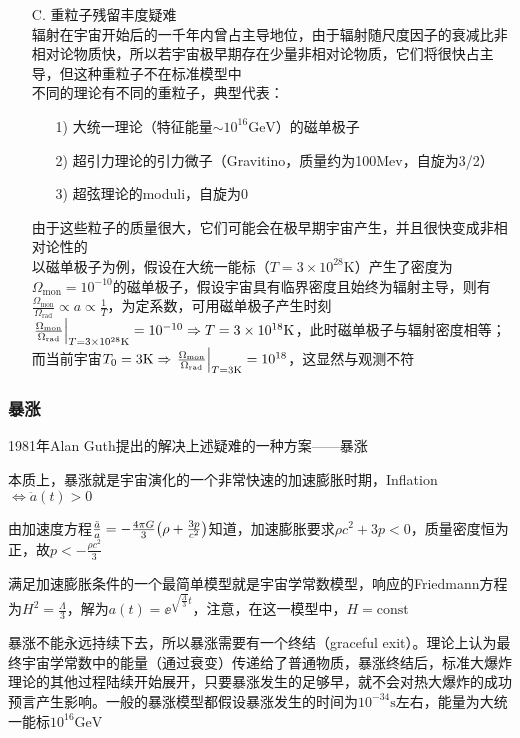 \begin{itemize}
	\item[C. ] 重粒子残留丰度疑难 \\
	辐射在宇宙开始后的一千年内曾占主导地位，由于辐射随尺度因子的衰减比非相对论物质快，所以若宇宙极早期存在少量非相对论物质，它们将很快占主导，但这种重粒子不在标准模型中 \\
	不同的理论有不同的重粒子，典型代表：
	\begin{itemize}
		\item[1)] 大统一理论（特征能量$\sim 10^{16} \mathrm{GeV}$）的磁单极子
		\item[2)] 超引力理论的引力微子（Gravitino，质量约为100Mev，自旋为3/2）
		\item[3)] 超弦理论的moduli，自旋为0
	\end{itemize}
	由于这些粒子的质量很大，它们可能会在极早期宇宙产生，并且很快变成非相对论性的 \\
	以磁单极子为例，假设在大统一能标（$T = 3 \times 10^{28} \mathrm{K}$）产生了密度为$\Omega_{\text{mon}} = 10^{-10}$的磁单极子，假设宇宙具有临界密度且始终为辐射主导，则有$\frac{\Omega_{\text{mon}}}{\Omega_{\text{rad}}} \propto a \propto \frac{1}{T}$，为定系数，可用磁单极子产生时刻$\eval{\frac{\Omega_{\text{mon}}}{\Omega_{\text{rad}}}}_{T = 3 \times 10^{28} \mathrm{K}} = 10^{-10} \Rightarrow T = 3 \times 10^{18} \mathrm{K}$，此时磁单极子与辐射密度相等；而当前宇宙$T_0 = 3 \mathrm{K} \Rightarrow \eval{\frac{\Omega_{\text{mon}}}{\Omega_{\text{rad}}}}_{T = 3  \mathrm{K}} = 10^{18}$，这显然与观测不符
\end{itemize}

\subsubsection{暴涨}
\par 
1981年Alan Guth提出的解决上述疑难的一种方案——暴涨
\par 
本质上，暴涨就是宇宙演化的一个非常快速的加速膨胀时期，Inflation$\Leftrightarrow \ddot{a}(t) > 0$
\par 
由加速度方程$\frac{\ddot{a}}{a} = - \frac{4 \pi G}{3} \qty(\rho + \frac{3 p}{c^2})$知道，加速膨胀要求$\rho c^2 + 3p < 0$，质量密度恒为正，故$p < - \frac{\rho c^2}{3}$
\par 
满足加速膨胀条件的一个最简单模型就是宇宙学常数模型，响应的Friedmann方程为$H^2 = \frac{\Lambda}{3}$，解为$a(t) = \ee^{\sqrt{\frac{\Lambda}{3}} t}$，注意，在这一模型中，$H = \text{const}$

\par 
暴涨不能永远持续下去，所以暴涨需要有一个终结（graceful exit）。理论上认为最终宇宙学常数中的能量（通过衰变）传递给了普通物质，暴涨终结后，标准大爆炸理论的其他过程陆续开始展开，只要暴涨发生的足够早，就不会对热大爆炸的成功预言产生影响。一般的暴涨模型都假设暴涨发生的时间为$10^{-34} \mathrm{s}$左右，能量为大统一能标$10^{16} \mathrm{GeV}$

